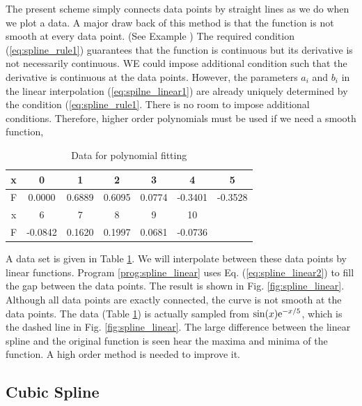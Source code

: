 The present scheme simply connects data points by straight lines as we do when we plot a data. 
A major draw back of this method is that the function is not smooth at every data point. (See Example ) 
The required condition (\ref{eq:spline_rule1}) guarantees that the function is continuous but its derivative is not necessarily continuous.  WE could impose additional condition such that the derivative is continuous at the data points.  However, the parameters $a_i$ and $b_i$ in the linear interpolation (\ref{eq:spilne_linear1}) are already uniquely determined by the condition (\ref{eq:spline_rule1}.  There is no room to impose additional conditions.  Therefore, higher order polynomials must be used if we need a smooth function,

\begin{example}\label{ex:spline_linear}

\begin{table}
\centering
\caption{Data for polynomial fitting}\label{tbl:spline_data}
\begin{tabular}{c | c c c c c c}
\hline
x & 0 & 1 & 2 & 3 & 4 & 5\\
\hline
F & 0.0000& 0.6889& 0.6095& 0.0774& -0.3401& -0.3528\\
\hline\hline
x  & 6 & 7 & 8 & 9 & 10 & \\
\hline
F  & -0.0842& 0.1620& 0.1997& 0.0681& -0.0736 &\\
\hline
\end{tabular}
\end{table}

A data set is given in Table \ref{tbl:spline_data}.   We will interpolate between these data points by linear functions. Program \ref{prog:spline_linear} uses 
Eq. (\ref{eq:spline_linear2}) to fill the gap between the data points.  The result is shown in Fig. \ref{fig:spline_linear}.   Although all data points are exactly connected, the curve is not smooth at the data points.  The data (Table  \ref{tbl:spline_data}) is actually sampled from $\sin(x) \text{e}^{-x/5}$, which is the dashed line in Fig. \ref{fig:spline_linear}.  The large difference between the linear spline and the original function is seen hear the maxima and minima of the function.  A high order method is needed to improve it.
\end{example} 

\subsection{Cubic Spline}

